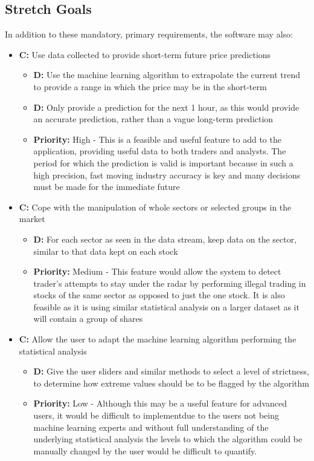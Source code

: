 \documentclass[11pt, oneside, a4paper]{article}
\begin{document}
\subsection{Stretch Goals}
In addition to these mandatory, primary requirements, the software may also:
\begin{itemize}
	\item \textbf{C:} Use data collected to provide short-term future price predictions
	\begin{itemize}
		\item \textbf{D:} Use the machine learning algorithm to extrapolate the current trend to provide a range in which the price may be in the short-term
		\item \textbf{D:} Only provide a prediction for the next 1 hour, as this would provide an accurate prediction, rather than a vague long-term prediction
		\item \textbf{Priority:} High - This is a feasible and useful feature to add to the application, providing useful data to both traders and analysts. The period for which the prediction is valid is important because in such a high precision, fast moving industry accuracy is key and many decisions must be made for the immediate future
	\end{itemize}
	\item \textbf{C:} Cope with the manipulation of whole sectors or selected groups in the market
	\begin{itemize}
		\item \textbf{D:} For each sector as seen in the data stream, keep data on the sector, similar to that data kept on each stock
		\item \textbf{Priority:} Medium - This feature would allow the system to detect trader’s attempts to stay under the radar by performing illegal trading in stocks of the same sector as opposed to just the one stock. It is also feasible as it is using similar statistical analysis on a larger dataset as it will contain a group of shares
	\end{itemize}
	\item \textbf{C:} Allow the user to adapt the machine learning algorithm performing the statistical analysis
	\begin{itemize}
		\item \textbf{D:} Give the user sliders and similar methods to select a level of strictness, to determine how extreme values should be to be flagged by the algorithm
		\item \textbf{Priority:} Low - Although this may be a useful feature for advanced users, it would be difficult to implementdue to the users not being machine learning experts and without full understanding of the underlying statistical analysis the levels to which the algorithm could be manually changed by the user would be difficult to quantify.

\end{itemize}
\end{itemize}
\end{document}
